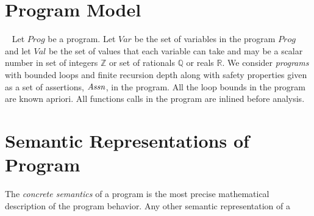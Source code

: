 \section{Program Model}~\label{pmodel}
%
Let $Prog$ be a program. Let $Var$ be the set of variables in the program $Prog$
and let $Val$ be the set of values that each variable can take and may be a 
scalar number in set of integers $\mathbb{Z}$ or set of rationals
$\mathbb{Q}$ or reals $\mathbb{R}$.
%
We consider \emph{programs} with bounded loops and finite recursion depth 
along with safety properties given as a set of assertions, $\mathit{Assn}$, 
in the program.  All the loop bounds in the program are known apriori. 
All functions calls in the program are inlined before analysis.  
%
\section{Semantic Representations of Program}
%
The \emph{concrete semantics} of a program is the most precise mathematical
description of the program behavior. Any other semantic representation of a
